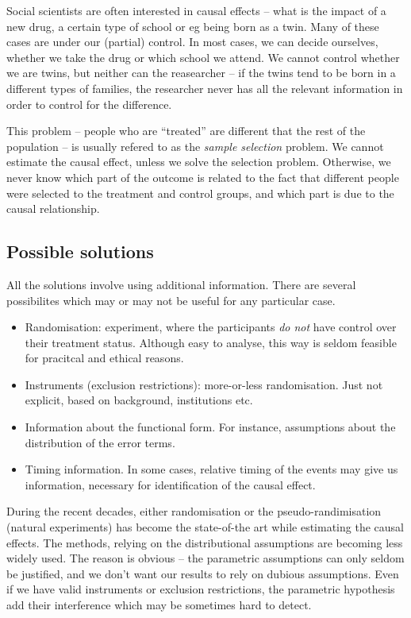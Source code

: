 
Social scientists are often interested in causal effects -- what is
the impact of a new drug, a certain type of school or eg being born as
a twin.  Many of these cases are under our (partial) control.  In most
cases, we can decide ourselves, whether we take the drug or which
school we attend.  We cannot control whether we are twins, but neither
can the reasearcher -- if the twins tend to be born in a different
types of families, the researcher never has all the relevant
information in order to control for the difference.

This problem -- people who are ``treated'' are different that the rest
of the population -- is usually refered to as the \emph{sample
  selection} problem.  We cannot estimate the causal effect, unless we
solve the selection problem.  Otherwise, we never know which part of
the outcome is related to the fact that different people were selected
to the treatment and control groups, and which part is due to the
causal relationship.


\subsection{Possible solutions}

All the solutions involve using additional information.  There are
several possibilites which may or may not be useful for any particular
case. 

\begin{itemize}
\item Randomisation: experiment, where the participants \emph{do not}
  have control over their treatment status.  Although easy to analyse,
  this way is seldom feasible for pracitcal and ethical reasons.
\item Instruments (exclusion restrictions): more-or-less
  randomisation.  Just not explicit, based on background, institutions
  etc.
\item Information about the functional form.  For instance,
  assumptions about the distribution of the error terms.
\item Timing information.  In some cases, relative timing of the
  events may give us information, necessary for identification of the
  causal effect.
\end{itemize}

During the recent decades, either randomisation or the
pseudo-randimisation (natural experiments) has become the state-of-the
art while estimating the causal effects.  The methods, relying on the
distributional assumptions are becoming less widely used.  The reason
is obvious -- the parametric assumptions can only seldom be justified,
and we don't want our results to rely on dubious assumptions.  Even if
we have valid instruments or exclusion restrictions, the parametric
hypothesis add their interference which may be sometimes hard to
detect.  

